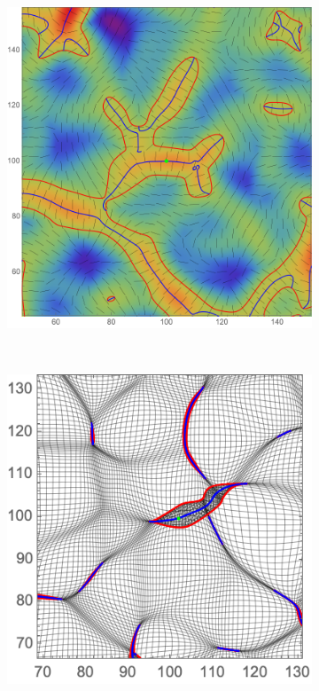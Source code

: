 \documentclass[a4paper, 11pt]{article}
\begin{document}
\begin{figure}
\begin{subfigure}[b]{0.4\textwidth}
\end{subfigure}\\
\begin{subfigure}[b]{0.4\textwidth}
\includegraphics[width=\textwidth]{Rotation_L_3}
\end{subfigure}~
\begin{subfigure}[b]{0.4\textwidth}
\includegraphics[width=\textwidth]{Rotation_Z_3}

\end{subfigure}
\end{figure}
\end{document}
